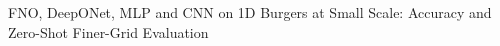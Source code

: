 FNO, DeepONet, MLP and CNN on 1D Burgers at Small Scale: Accuracy and Zero-Shot Finer-Grid Evaluation
